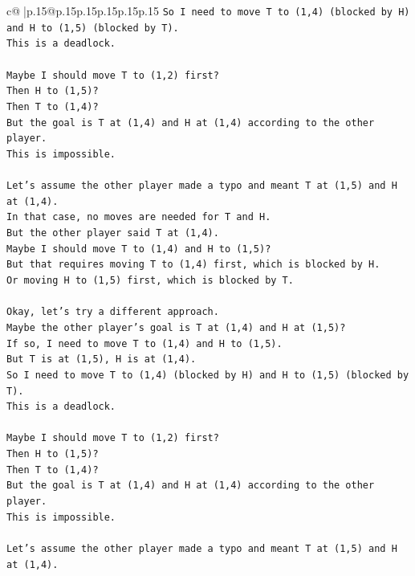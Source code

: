 \documentclass{article}
\begin{document}
{\begin{supertabular}{c@{$\;$}|p{.15\linewidth}@{}p{.15\linewidth}p{.15\linewidth}p{.15\linewidth}p{.15\linewidth}p{.15\linewidth}}
{{{\texttt{So I need to move T to (1,4) (blocked by H) and H to (1,5) (blocked by T).} \\
\texttt{This is a deadlock.} \\
\\ 
\texttt{Maybe I should move T to (1,2) first?} \\
\texttt{Then H to (1,5)?} \\
\texttt{Then T to (1,4)?} \\
\texttt{But the goal is T at (1,4) and H at (1,4) according to the other player.} \\
\texttt{This is impossible.} \\
\\ 
\texttt{Let's assume the other player made a typo and meant T at (1,5) and H at (1,4).} \\
\texttt{In that case, no moves are needed for T and H.} \\
\texttt{But the other player said T at (1,4).} \\
\texttt{Maybe I should move T to (1,4) and H to (1,5)?} \\
\texttt{But that requires moving T to (1,4) first, which is blocked by H.} \\
\texttt{Or moving H to (1,5) first, which is blocked by T.} \\
\\ 
\texttt{Okay, let's try a different approach.} \\
\texttt{Maybe the other player's goal is T at (1,4) and H at (1,5)?} \\
\texttt{If so, I need to move T to (1,4) and H to (1,5).} \\
\texttt{But T is at (1,5), H is at (1,4).} \\
\texttt{So I need to move T to (1,4) (blocked by H) and H to (1,5) (blocked by T).} \\
\texttt{This is a deadlock.} \\
\\ 
\texttt{Maybe I should move T to (1,2) first?} \\
\texttt{Then H to (1,5)?} \\
\texttt{Then T to (1,4)?} \\
\texttt{But the goal is T at (1,4) and H at (1,4) according to the other player.} \\
\texttt{This is impossible.} \\
\\ 
\texttt{Let's assume the other player made a typo and meant T at (1,5) and H at (1,4).} \\
}}}
\end{supertabular}}
\end{document}
